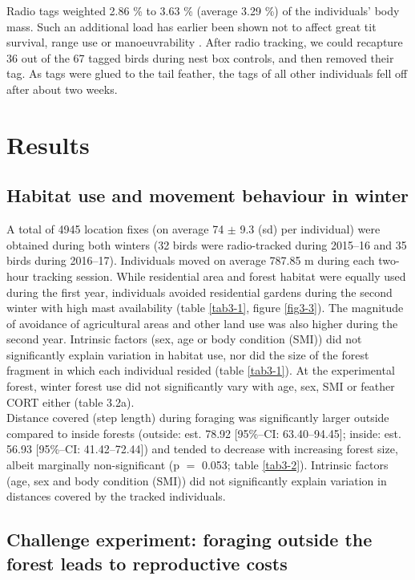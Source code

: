 \documentclass[10pt, twoside]{book} %
\begin{document}
Radio tags weighted 2.86 \% to 3.63 \% (average 3.29 \%) of the individuals' body mass. Such an additional load has earlier been shown not to affect great tit survival, range use or manoeuvrability \citep{Naef-Daenzer2001}. After radio tracking, we could recapture 36 out of the 67 tagged birds during nest box controls, and then removed their tag. As tags were glued to the tail feather, the tags of all other individuals fell off after about two weeks.

\clearpage	
	\section{Results}
	\subsection*{Habitat use and movement behaviour in winter}
	
A total of 4945 location fixes (on average 74 $\pm$ 9.3 (sd) per individual) were obtained during both winters (32 birds were radio-tracked during 2015--16 and 35 birds during 2016--17). Individuals moved on average 787.85 m during each two-hour tracking session. While residential area and forest habitat were equally used during the first year, individuals avoided residential gardens during the second winter with high mast availability (table \ref{tab3-1}, figure \ref{fig3-3}). The magnitude of avoidance of agricultural areas and other land use was also higher during the second year. Intrinsic factors (sex, age or body condition (SMI)) did not significantly explain variation in habitat use, nor did the size of the forest fragment in which each individual resided (table \ref{tab3-1}). At the experimental forest, winter forest use did not significantly vary with age, sex, SMI or feather CORT either (table 3.2a).\\

Distance covered (step length) during foraging was significantly larger outside compared to inside forests (outside: est. 78.92 [95\%--CI: 63.40--94.45]; inside: est. 56.93 [95\%--CI: 41.42--72.44]) and tended to decrease with increasing forest size, albeit marginally non-significant (p $=$ 0.053; table \ref{tab3-2}). Intrinsic factors (age, sex and body condition (SMI)) did not significantly explain variation in distances covered by the tracked individuals. 


	\subsection*{Challenge experiment: foraging outside the forest leads to reproductive costs}
	
\end{document}
